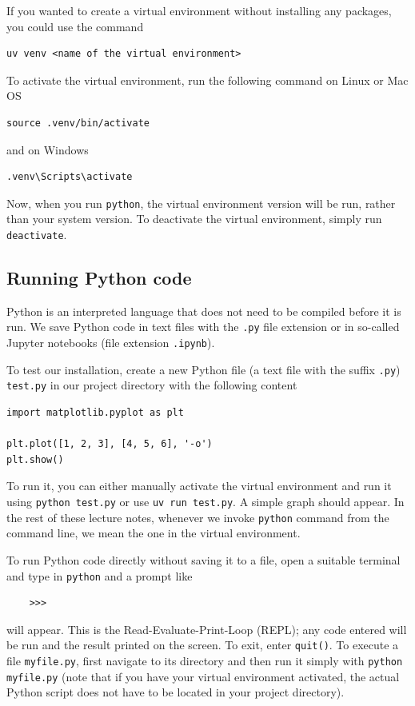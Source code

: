 If you wanted to create a virtual environment without installing any packages, you could use the command
\begin{lstlisting}
uv venv <name of the virtual environment>
\end{lstlisting}

To activate the virtual environment, run the following command on Linux or Mac OS
\begin{lstlisting}
source .venv/bin/activate
\end{lstlisting}
and on Windows
\begin{lstlisting}
.venv\Scripts\activate
\end{lstlisting}

Now, when you run \verb|python|, the virtual environment version will be run, rather than your system version. To deactivate the virtual environment, simply run \verb|deactivate|.

\subsection{Running Python code}
Python is an interpreted language that does not need to be compiled before it is run. We save Python code in text files with the \verb|.py| file extension or in so-called Jupyter notebooks (file extension \verb|.ipynb|).

To test our installation, create a new Python file (a text file with the suffix \verb|.py|) \verb|test.py| in our project directory with the following content
\begin{lstlisting}
import matplotlib.pyplot as plt

plt.plot([1, 2, 3], [4, 5, 6], '-o')
plt.show()
\end{lstlisting}
To run it, you can either manually activate the virtual environment and run it using
\verb|python test.py| or use \verb|uv run test.py|. A simple graph should appear. In the rest of these lecture notes, whenever we invoke \verb|python| command from the command line, we mean the one in the virtual environment.

To run Python code directly without saving it to a file, open a suitable terminal and type in \verb|python| and a prompt like
\begin{lstlisting}
    >>>
\end{lstlisting}
will appear. This is the Read-Evaluate-Print-Loop (REPL); any code entered will be run and the result printed on the screen. To exit, enter \verb|quit()|. To execute a file \verb|myfile.py|, first navigate to its directory and then run it simply with \verb|python myfile.py| (note that if you have your virtual environment activated, the actual Python script does not have to be located in your project directory).

